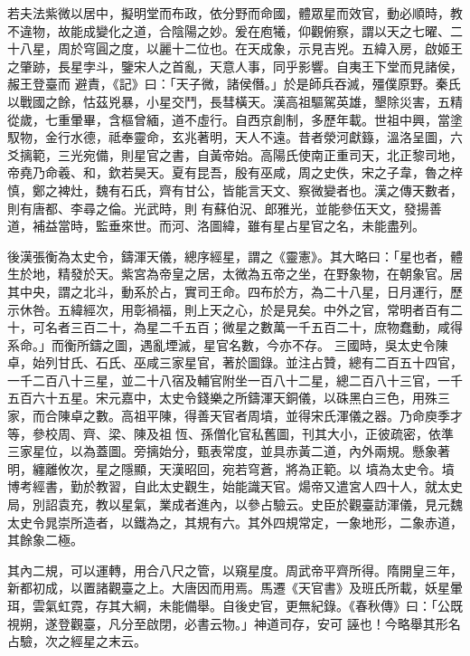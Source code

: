 
\begin{pinyinscope}

 若夫法紫微以居中，擬明堂而布政，依分野而命國，體眾星而效官，動必順時，教不違物，故能成變化之道，合陰陽之妙。爰在庖犧，仰觀俯察，謂以天之七曜、二十八星，周於穹圓之度，以麗十二位也。在天成象，示見吉兇。五緯入房，啟姬王之肇跡，長星孛斗，鑒宋人之首亂，天意人事，同乎影響。自夷王下堂而見諸侯，赧王登臺而
 避責，《記》曰：「天子微，諸侯僭。」於是師兵吞滅，殭僕原野。秦氏以戰國之餘，怙茲兇暴，小星交鬥，長彗橫天。漢高祖驅駕英雄，墾除災害，五精從歲，七重暈畢，含樞曾緬，道不虛行。自西京創制，多歷年載。世祖中興，當塗馭物，金行水德，祗奉靈命，玄兆著明，天人不遠。昔者滎河獻籙，溫洛呈圖，六爻摛範，三光宛備，則星官之書，自黃帝始。高陽氏使南正重司天，北正黎司地，帝堯乃命羲、和，欽若昊天。夏有昆吾，殷有巫咸，周之史佚，宋之子韋，魯之梓慎，鄭之裨灶，魏有石氏，齊有甘公，皆能言天文、察微變者也。漢之傳天數者，則有唐都、李尋之倫。光武時，則
 有蘇伯況、郎雅光，並能參伍天文，發揚善道，補益當時，監垂來世。而河、洛圖緯，雖有星占星官之名，未能盡列。



 後漢張衡為太史令，鑄渾天儀，總序經星，謂之《靈憲》。其大略曰：「星也者，體生於地，精發於天。紫宮為帝皇之居，太微為五帝之坐，在野象物，在朝象官。居其中央，謂之北斗，動系於占，實司王命。四布於方，為二十八星，日月運行，歷示休咎。五緯經次，用彰禍福，則上天之心，於是見矣。中外之官，常明者百有二十，可名者三百二十，為星二千五百；微星之數萬一千五百二十，庶物蠢動，咸得系命。」而衡所鑄之圖，遇亂堙滅，星官名數，今亦不存。
 三國時，吳太史令陳卓，始列甘氏、石氏、巫咸三家星官，著於圖錄。並注占贊，總有二百五十四官，一千二百八十三星，並二十八宿及輔官附坐一百八十二星，總二百八十三官，一千五百六十五星。宋元嘉中，太史令錢樂之所鑄渾天銅儀，以硃黑白三色，用殊三家，而合陳卓之數。高祖平陳，得善天官者周墳，並得宋氏渾儀之器。乃命庾季才等，參校周、齊、梁、陳及祖恆、孫僧化官私舊圖，刊其大小，正彼疏密，依準三家星位，以為蓋圖。旁摛始分，甄表常度，並具赤黃二道，內外兩規。懸象著明，纏離攸次，星之隱顯，天漢昭回，宛若穹蒼，將為正範。以
 墳為太史令。墳博考經書，勤於教習，自此太史觀生，始能識天官。煬帝又遣宮人四十人，就太史局，別詔袁充，教以星氣，業成者進內，以參占驗云。史臣於觀臺訪渾儀，見元魏太史令晁崇所造者，以鐵為之，其規有六。其外四規常定，一象地形，二象赤道，其餘象二極。



 其內二規，可以運轉，用合八尺之管，以窺星度。周武帝平齊所得。隋開皇三年，新都初成，以置諸觀臺之上。大唐因而用焉。馬遷《天官書》及班氏所載，妖星暈珥，雲氣虹霓，存其大綱，未能備舉。自後史官，更無紀錄。《春秋傳》曰：「公既視朔，遂登觀臺，凡分至啟閉，必書云物。」神道司存，安可
 誣也！今略舉其形名占驗，次之經星之末云。




\end{pinyinscope}
